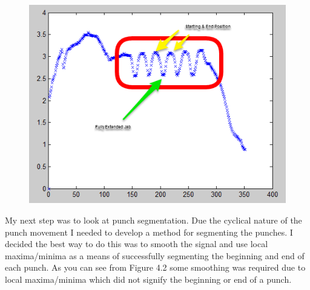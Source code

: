 \begin{figure}[h]
    \centering
    \includegraphics[height=0.25\textheight]{fig04/fig01}
    \label{fig:kinect}
\end{figure}



My next step was to look at  punch segmentation. Due the cyclical nature of the punch movement I needed to develop a method for segmenting the punches. I decided the best way to do this was to smooth the signal and use local maxima/minima as a means of successfully segmenting the beginning and end of each punch. As you can see from Figure 4.2 some smoothing was required due to local maxima/minima which did not signify the beginning or end of a punch.




